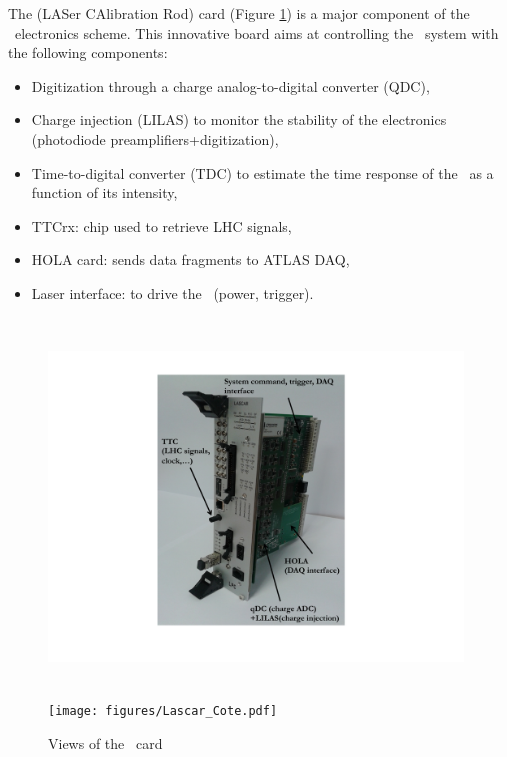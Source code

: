 The \lascar (LASer CAlibration Rod) card (Figure \ref{fig:laslascar}) is a major component of the \lasii~electronics scheme. This innovative board aims at controlling the \las~system with the following components:
\begin{itemize}

\item Digitization through a charge analog-to-digital converter (QDC),

\item Charge injection (LILAS) to monitor the stability of the electronics (photodiode preamplifiers+digitization),

\item Time-to-digital converter (TDC) to estimate the time response of the \las~as a function of its intensity,

\item TTCrx: chip used to retrieve LHC signals,

\item HOLA card: sends data fragments to ATLAS DAQ,

\item Laser interface: to drive the \las~(power, trigger).

\end{itemize}

\begin{figure}[htbp]

\centering
\includegraphics[height=10cm,width=11cm]{figures/Lascar_photo_black.pdf}
\texttt{[image: figures/Lascar\_Cote.pdf]}
\caption{Views of the \lascar~card}\label{fig:laslascar}
\end{figure}


